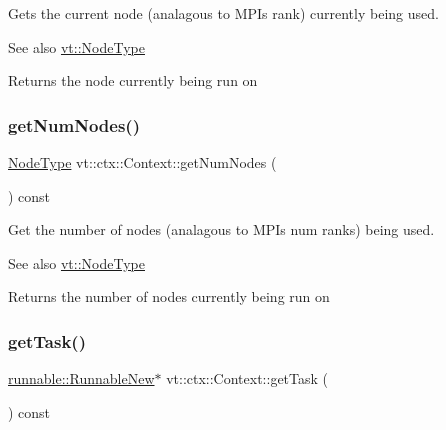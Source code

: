 Gets the current node (analagous to M\+PI\textquotesingle{}s rank) currently being used. 

\begin{DoxySeeAlso}{See also}
{\ttfamily \hyperlink{namespacevt_a866da9d0efc19c0a1ce79e9e492f47e2}{vt\+::\+Node\+Type}} 
\end{DoxySeeAlso}
\begin{DoxyReturn}{Returns}
the node currently being run on 
\end{DoxyReturn}
\mbox{\label{structvt_1_1ctx_1_1_context_a7f41071aadf6d5fa9e1b6c703c5ff19d}} 
\subsubsection{\texorpdfstring{get\+Num\+Nodes()}{getNumNodes()}}
{\footnotesize\ttfamily \hyperlink{namespacevt_a866da9d0efc19c0a1ce79e9e492f47e2}{Node\+Type} vt\+::ctx\+::\+Context\+::get\+Num\+Nodes (\begin{DoxyParamCaption}{ }\end{DoxyParamCaption}) const\hspace{0.3cm}{\ttfamily [inline]}}



Get the number of nodes (analagous to M\+PI\textquotesingle{}s num ranks) being used. 

\begin{DoxySeeAlso}{See also}
{\ttfamily \hyperlink{namespacevt_a866da9d0efc19c0a1ce79e9e492f47e2}{vt\+::\+Node\+Type}} 
\end{DoxySeeAlso}
\begin{DoxyReturn}{Returns}
the number of nodes currently being run on 
\end{DoxyReturn}
\mbox{\label{structvt_1_1ctx_1_1_context_a4e78f77717329369173daf1b270a25b0}} 
\subsubsection{\texorpdfstring{get\+Task()}{getTask()}}
{\footnotesize\ttfamily \hyperlink{structvt_1_1runnable_1_1_runnable_new}{runnable\+::\+Runnable\+New}$\ast$ vt\+::ctx\+::\+Context\+::get\+Task (\begin{DoxyParamCaption}{ }\end{DoxyParamCaption}) const\hspace{0.3cm}{\ttfamily [inline]}}



